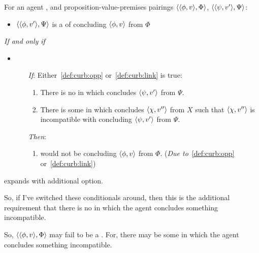 \begin{note}[\curb{3}]
  \begin{definition}[A \curb{0}]
    \label{def:curb}
    For an agent \vAgent{}, and proposition-value-premises pairings \(\langle \langle \phi, v \rangle, \Phi \rangle\), \(\langle \langle \psi, v' \rangle, \Psi \rangle\):

    \begin{itemize}
    \item
      \(\langle \langle \phi, v' \rangle, \Psi \rangle\) is a \emph{\curb{}} of concluding \(\langle \phi, v \rangle\) from \(\Phi\)
    \end{itemize}

    \emph{If and only if}

    \begin{itemize}
    \item
        \begin{enumerate}
        \item[\emph{If}:]
          Either~\ref{def:curb:opp} or~\ref{def:curb:link} is true:

          \begin{enumerate}[label=\alph*., ref=(\alph*)]
          \item
            \label{def:curb:opp}
            There is no \pevent{} in which \vAgent{} concludes \(\langle \psi, v' \rangle\) from \(\Psi\).
          \item
            \label{def:curb:link}
            There is some \pevent{} in which \vAgent{} concludes \(\langle \chi, v'' \rangle\) from \(X\) such that \(\langle \chi, v'' \rangle\) is incompatible with concluding \(\langle \psi, v' \rangle\) from \(\Psi\).
          \end{enumerate}
        \item[\emph{Then}:]
          \begin{enumerate}[label=\alph*., ref=(\alph*), resume]
          \item
            \label{def:curb:fail}
            \vAgent{} would not be concluding \(\langle \phi, v \rangle\) from \(\Phi\).%
            \hfill(\emph{Due to}~\ref{def:curb:opp} or~\ref{def:curb:link})
          \end{enumerate}
      \end{enumerate}
    \end{itemize}
    \vspace{-\baselineskip}
  \end{definition}

  \curb{} expands \bCurb{} with additional option.

  So, if I've switched these conditionals around, then this is the additional requirement that there is no \pevent{} in which the agent concludes something incompatible.

  So, \(\langle \langle \phi, v \rangle, \Phi \rangle\) may fail to be a \curb{}.
  For, there may be some \pevent{} in which the agent concludes something incompatible.
\end{note}

